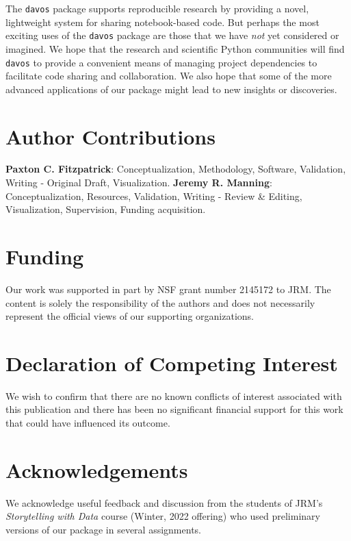 \documentclass[preprint,12pt,a4paper]{elsarticle}
\begin{document}
The \texttt{davos} package supports reproducible research by providing
a novel, lightweight system for sharing notebook-based code. But
perhaps the most exciting uses of the \texttt{davos} package are those
that we have \textit{not} yet considered or imagined. We hope that the
research and scientific Python communities will find \texttt{davos} to provide a convenient
means of managing project dependencies to facilitate code sharing and collaboration. We
also hope that some of the more advanced applications of our package
might lead to new insights or discoveries.


\section*{Author Contributions}

\textbf{Paxton C. Fitzpatrick}: Conceptualization, Methodology,
Software, Validation, Writing - Original Draft,
Visualization. \textbf{Jeremy R. Manning}: Conceptualization,
Resources, Validation, Writing - Review \& Editing, Visualization, Supervision,
Funding acquisition.

\section*{Funding}

Our work was supported in part by NSF grant number 2145172 to JRM.
The content is solely the responsibility of the authors and does not
necessarily represent the official views of our supporting
organizations.


\section*{Declaration of Competing Interest}

We wish to confirm that there are no known conflicts of interest
associated with this publication and there has been no significant
financial support for this work that could have influenced its
outcome.


\section*{Acknowledgements}

We acknowledge useful feedback and discussion from the students of
JRM's \textit{Storytelling with Data} course (Winter, 2022 offering)
who used preliminary versions of our package in several assignments.



\end{document}
